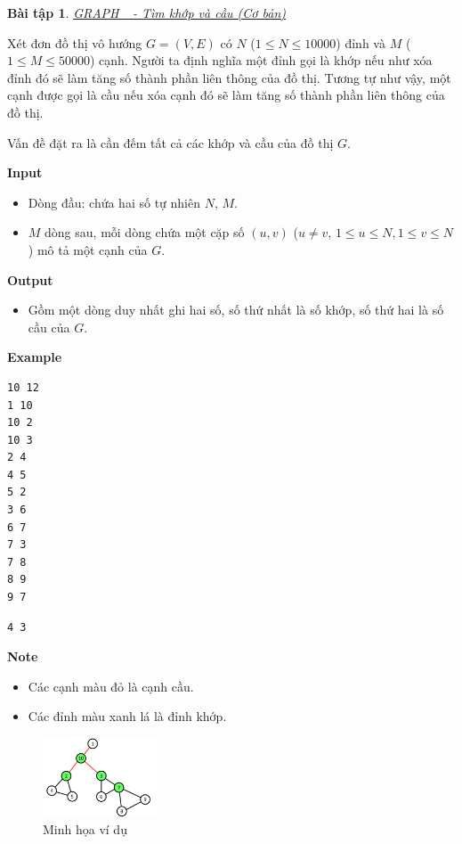 \documentclass{article}
\newtheorem{baitap}{Bài tập}
\begin{document}
\begin{baitap}
    \href{https://oj.vnoi.info/problem/graph_}{GRAPH\_ - Tìm khớp và cầu (Cơ bản)}
\end{baitap}

Xét đơn đồ thị vô hướng $G = (V, E)$ có $N$ ($1 \leq N \leq 10000$) đỉnh và $M$ ($1 \leq M \leq 50000$) cạnh. Người ta định nghĩa một đỉnh gọi là khớp nếu như xóa đỉnh đó sẽ làm tăng số thành phần liên thông của đồ thị. Tương tự như vậy, một cạnh được gọi là cầu nếu xóa cạnh đó sẽ làm tăng số thành phần liên thông của đồ thị.

Vấn đề đặt ra là cần đếm tất cả các khớp và cầu của đồ thị $G$.

\textbf{Input}
\begin{itemize}
    \item Dòng đầu: chứa hai số tự nhiên $N$, $M$.
    \item $M$ dòng sau, mỗi dòng chứa một cặp số $(u, v)$ ($u \neq v$, $1 \leq u \leq N, 1 \leq v \leq N$) mô tả một cạnh của $G$.
\end{itemize}

\textbf{Output}
\begin{itemize}
    \item Gồm một dòng duy nhất ghi hai số, số thứ nhất là số khớp, số thứ hai là số cầu của $G$.
\end{itemize}

\textbf{Example}

\begin{lstlisting}[caption={Input}]
10 12
1 10
10 2
10 3
2 4
4 5
5 2
3 6
6 7
7 3
7 8
8 9
9 7
\end{lstlisting}
\begin{lstlisting}[caption={Output}]
4 3 
\end{lstlisting}

\textbf{Note}
\begin{itemize}
    \item Các cạnh màu đỏ là cạnh cầu.
    \item Các đỉnh màu xanh lá là đỉnh khớp.
\end{itemize}

\begin{figure}[h]
    \centering
    \includegraphics[width=0.3\textwidth]{img/b4/Depth-First-Search-Tree_img5.png}
    \caption{Minh họa ví dụ}
\end{figure}
\end{document}
